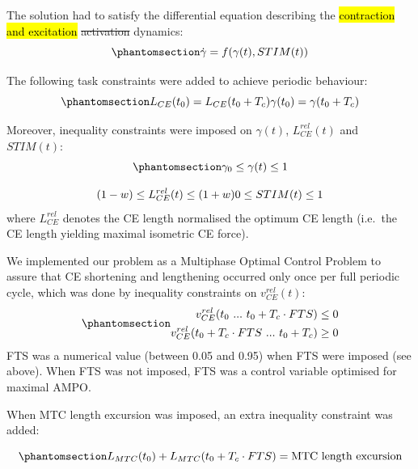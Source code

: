 \documentclass[
  11pt,
  a4paper]{article}
\begin{document}
The solution had to satisfy the differential equation describing the
\hl{contraction and excitation} \st{activation} dynamics:
\begin{equation}\protect\phantomsection\label{eq-dynamic-con}{
\dot{\gamma} = f(\gamma(t),STIM(t))
}\end{equation}

The following task constraints were added to achieve periodic behaviour:
\begin{equation}\protect\phantomsection\label{eq-task-con}{
  L_{CE}(t_0) = L_{CE}(t_0+T_c) \\
  \gamma(t_0) = \gamma(t_0+T_c)
}\end{equation}

Moreover, inequality constraints were imposed on \(\gamma(t)\),
\(L_{CE}^{rel}(t)\) and \(STIM(t)\):
\begin{equation}\protect\phantomsection\label{eq-ineq-con1}{
  \gamma_0 \leq \gamma(t) \leq 1 
}\end{equation}

\[
  (1-w) \leq L_{CE}^{rel}(t) \leq (1+w) \\
  0 \leq STIM(t) \leq 1
\] where \(L_{CE}^{rel}\) denotes the CE length normalised the optimum
CE length (i.e.~the CE length yielding maximal isometric CE force).

We implemented our problem as a Multiphase Optimal Control Problem to
assure that CE shortening and lengthening occurred only once per full
periodic cycle, which was done by inequality constraints on
\(v_{CE}^{rel}(t)\):
\begin{equation}\protect\phantomsection\label{eq-fts-con}{
\begin{aligned}
  v_{CE}^{rel}(t_0 \ ... \ t_0 + T_c \cdot FTS) &\leq 0 \\
  v_{CE}^{rel}(t_0 + T_c \cdot FTS \ ... \ t_0 + T_c) &\geq 0
\end{aligned}
}\end{equation} FTS was a numerical value (between 0.05 and 0.95) when
FTS were imposed (see above). When FTS was not imposed, FTS was a
control variable optimised for maximal AMPO.

When MTC length excursion was imposed, an extra inequality constraint
was added:

\begin{equation}\protect\phantomsection\label{eq-lcecon}{
  L_{MTC}(t_0) + L_{MTC}(t_0 + T_c \cdot FTS) = \textrm{MTC length excursion}
}\end{equation}
\end{document}
